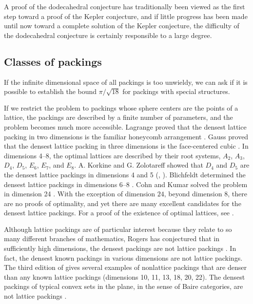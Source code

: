 A proof of the dodecahedral conjecture has traditionally been
viewed as the first step toward a proof of the Kepler conjecture,
and if little progress has been made until now toward a complete
solution of the Kepler conjecture, the difficulty of the dodecahedral
conjecture is certainly responsible to a large degree.

\subsection{Classes of packings}

If the infinite dimensional space of all packings is too unwieldy,
we can ask if it is possible to establish the bound $\pi/\sqrt{18}$
for packings with special structures.

If we restrict the problem
to packings whose sphere centers are the points of a lattice, the
 packings are described by a finite number of parameters, and the
problem becomes much more accessible.  Lagrange proved that the
densest lattice packing in two dimensions is the familiar honeycomb
arrangement \cite{Lag73}. Gauss proved that the densest lattice
packing in three dimensions is the face-centered cubic \cite{Gau31}.
In dimensions 4--8, the optimal lattices are described by their root
systems, $A_2$, $A_3$, $D_4$, $D_5$, $E_6$, $E_7$, and $E_8$. A.
Korkine and G. Zolotareff showed that $D_4$ and $D_5$ are the
densest lattice packings in dimensions 4 and 5 (\cite{KoZ73},
\cite{KoZ77}). Blichfeldt determined the densest lattice packings in
dimensions 6--8 \cite{Bli35}. Cohn and Kumar solved the problem in
dimension 24 \cite{CoKu}.  With the exception of dimension $24$,
beyond dimension $8$, there are no proofs of optimality, and yet
there are many excellent candidates for the densest lattice
packings.  For a proof of the existence of optimal lattices, see
\cite{Oes90}.


Although lattice packings are of particular interest because they
relate to so many different branches of mathematics, Rogers has
conjectured that in sufficiently high dimensions, the densest
packings are not lattice packings \cite{Rog64}.   In fact,
the densest known packings in various dimensions are not lattice
packings.  The third edition of \cite{CoSl93} gives several examples
of nonlattice packings that are denser than any known lattice
packings (dimensions 10, 11, 13, 18, 20, 22).
The densest packings of typical convex sets in the plane,
in the sense
of Baire categories, are not lattice packings \cite{Fej95}.

